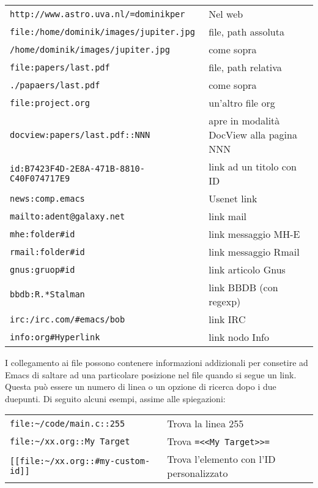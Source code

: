 \documentclass[11pt]{article}
\begin{document}
\begin{center}
\begin{tabular}{ll}
\texttt{http://www.astro.uva.nl/=dominikper} & Nel web\\[0pt]
\texttt{file:/home/dominik/images/jupiter.jpg} & file, path assoluta\\[0pt]
\texttt{/home/dominik/images/jupiter.jpg} & come sopra\\[0pt]
\texttt{file:papers/last.pdf} & file, path relativa\\[0pt]
\texttt{./papaers/last.pdf} & come sopra\\[0pt]
\texttt{file:project.org} & un'altro file org\\[0pt]
\texttt{docview:papers/last.pdf::NNN} & apre in modalità DocView alla pagina NNN\\[0pt]
\texttt{id:B7423F4D-2E8A-471B-8810-C40F074717E9} & link ad un titolo con ID\\[0pt]
\texttt{news:comp.emacs} & Usenet link\\[0pt]
\texttt{mailto:adent@galaxy.net} & link mail\\[0pt]
\texttt{mhe:folder\#id} & link messaggio MH-E\\[0pt]
\texttt{rmail:folder\#id} & link messaggio Rmail\\[0pt]
\texttt{gnus:gruop\#id} & link articolo Gnus\\[0pt]
\texttt{bbdb:R.*Stalman} & link BBDB (con regexp)\\[0pt]
\texttt{irc:/irc.com/\#emacs/bob} & link IRC\\[0pt]
\texttt{info:org\#Hyperlink} & link nodo Info\\[0pt]
\end{tabular}
\end{center}

I collegamento ai file possono contenere informazioni addizionali per
consetire ad Emacs di saltare ad una particolare posizione nel file
quando si segue un link. Questa può essere un numero di linea o un
opzione di ricerca dopo i due duepunti. Di seguito alcuni esempi,
assime alle spiegazioni:

\begin{center}
\begin{tabular}{ll}
\texttt{file:\textasciitilde{}/code/main.c::255} & Trova la linea 255\\[0pt]
\texttt{file:\textasciitilde{}/xx.org::My Target} & Trova \texttt{=<{}<{}My Target>{}>{}=}\\[0pt]
\texttt{[[file:\textasciitilde{}/xx.org::\#my-custom-id]]} & Trova l'elemento con l'ID personalizzato\\[0pt]
\end{tabular}
\end{center}
\end{document}
